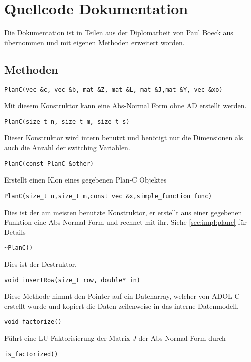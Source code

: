 \chapter{Quellcode Dokumentation}\label{sec:source}
Die Dokumentation ist in Teilen aus der Diplomarbeit von Paul Boeck aus \cite{boeck14} übernommen und mit eigenen Methoden erweitert worden.
\section[Public Methods]{\texorpdfstring{}{Public} Methoden}
\lstset{
		aboveskip=0pt,
		belowskip=0pt,
		columns=flexible,
	}
\begin{lstlisting}[numbers=none]
PlanC(vec &c, vec &b, mat &Z, mat &L, mat &J,mat &Y, vec &xo)
\end{lstlisting}
Mit diesem Konstruktor kann eine Abs-Normal Form ohne AD erstellt werden.
\begin{lstlisting}[numbers=none]
PlanC(size_t n, size_t m, size_t s)
\end{lstlisting}
Dieser Konstruktor wird intern benutzt und benötigt nur die Dimensionen als auch die Anzahl der switching Variablen.
\begin{lstlisting}[numbers=none]
PlanC(const PlanC &other)
\end{lstlisting}
Erstellt einen Klon eines gegebenen Plan-C Objektes
\begin{lstlisting}[numbers=none]
PlanC(size_t n,size_t m,const vec &x,simple_function func)
\end{lstlisting}
Dies ist der am meisten benutzte Konstruktor, er erstellt aus einer gegebenen Funktion eine Abs-Normal Form und rechnet mit ihr. Siehe \ref{sec:impl:planc} für Details
\begin{lstlisting}[numbers=none]
~PlanC()
\end{lstlisting}
Dies ist der Destruktor.
\begin{lstlisting}[numbers=none]
void insertRow(size_t row, double* in)
\end{lstlisting}
Diese Methode nimmt den Pointer auf ein Datenarray, welcher von ADOL-C erstellt wurde und kopiert die Daten zeilenweise in das interne Datenmodell.
\begin{lstlisting}[numbers=none]
void factorize()
\end{lstlisting}
Führt eine LU Faktorisierung der Matrix $J$ der Abs-Normal Form durch
\begin{lstlisting}[numbers=none]
is_factorized()
\end{lstlisting}
